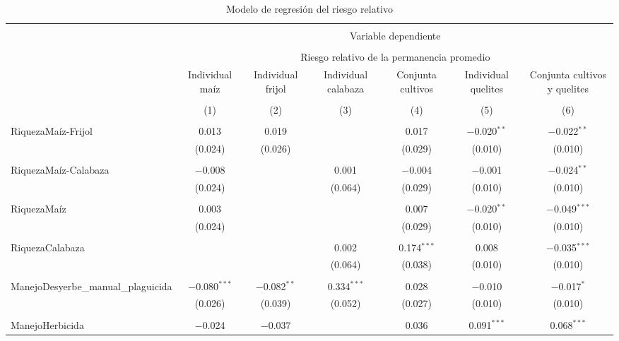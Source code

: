 \documentclass[spanish,11pt]{article}
\begin{document}
\setcounter{table}{1}
\begin{table}[!htbp] \centering 
  \caption{Modelo de regresión del riesgo relativo} 
  \label{} 
\begin{tabular}{@{\extracolsep{5pt}}lcccccc} 
\\[-1.8ex]\hline 
\hline \\[-1.8ex] 
 & \multicolumn{6}{c}{Variable dependiente} \\ 
\cline{2-7} 
\\[-1.8ex] & \multicolumn{6}{c}{Riesgo relativo de la permanencia promedio} \\ 
 & Individual maíz & Individual frijol & Individual calabaza & Conjunta cultivos & Individual quelites & Conjunta cultivos y quelites \\ 
\\[-1.8ex] & (1) & (2) & (3) & (4) & (5) & (6)\\ 
\hline \\[-1.8ex] 
 RiquezaMaíz-Frijol & 0.013 & 0.019 &  & 0.017 & $-$0.020$^{**}$ & $-$0.022$^{**}$ \\ 
  & (0.024) & (0.026) &  & (0.029) & (0.010) & (0.010) \\ 
  & & & & & & \\ 
 RiquezaMaíz-Calabaza & $-$0.008 &  & 0.001 & $-$0.004 & $-$0.001 & $-$0.024$^{**}$ \\ 
  & (0.024) &  & (0.064) & (0.029) & (0.010) & (0.010) \\ 
  & & & & & & \\ 
 RiquezaMaíz & 0.003 &  &  & 0.007 & $-$0.020$^{**}$ & $-$0.049$^{***}$ \\ 
  & (0.024) &  &  & (0.029) & (0.010) & (0.010) \\ 
  & & & & & & \\ 
 RiquezaCalabaza &  &  & 0.002 & 0.174$^{***}$ & 0.008 & $-$0.035$^{***}$ \\ 
  &  &  & (0.064) & (0.038) & (0.010) & (0.010) \\ 
  & & & & & & \\ 
 ManejoDesyerbe\_manual\_plaguicida & $-$0.080$^{***}$ & $-$0.082$^{**}$ & 0.334$^{***}$ & 0.028 & $-$0.010 & $-$0.017$^{*}$ \\ 
  & (0.026) & (0.039) & (0.052) & (0.027) & (0.010) & (0.010) \\ 
  & & & & & & \\ 
 ManejoHerbicida & $-$0.024 & $-$0.037 &  & 0.036 & 0.091$^{***}$ & 0.068$^{***}$ \\ 

\end{tabular}
\end{table}
\end{document}
